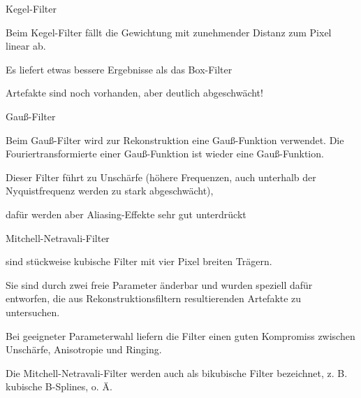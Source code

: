 \documentclass[landscape]{article}
\begin{document}
\begin{multicols}{3}
\begin{itemize*}
    \item Kegel-Filter
          \begin{itemize*}
            \item Beim Kegel-Filter fällt die Gewichtung mit zunehmender Distanz zum Pixel linear ab.
            \item Es liefert etwas bessere Ergebnisse als das Box-Filter
            \item Artefakte sind noch vorhanden, aber deutlich abgeschwächt!
          \end{itemize*}
          
    \item Gauß-Filter
          \begin{itemize*}
            \item Beim Gauß-Filter wird zur Rekonstruktion eine Gauß-Funktion verwendet. Die Fouriertransformierte einer Gauß-Funktion ist wieder eine Gauß-Funktion.
            \item Dieser Filter führt zu Unschärfe (höhere Frequenzen, auch unterhalb der Nyquistfrequenz werden zu stark abgeschwächt),
            \item dafür werden aber Aliasing-Effekte sehr gut unterdrückt
          \end{itemize*}
          
    \item Mitchell-Netravali-Filter
          \begin{itemize*}
            \item sind stückweise kubische Filter mit vier Pixel breiten Trägern.
            \item Sie sind durch zwei freie Parameter änderbar und wurden speziell dafür entworfen, die aus Rekonstruktionsfiltern resultierenden Artefakte zu untersuchen.
            \item Bei geeigneter Parameterwahl liefern die Filter einen guten Kompromiss zwischen Unschärfe, Anisotropie und Ringing.
            \item Die Mitchell-Netravali-Filter werden auch als bikubische Filter bezeichnet, z. B. kubische B-Splines, o. Ä.
          \end{itemize*}
  \end{itemize*}
  

\end{multicols}
\end{document}
